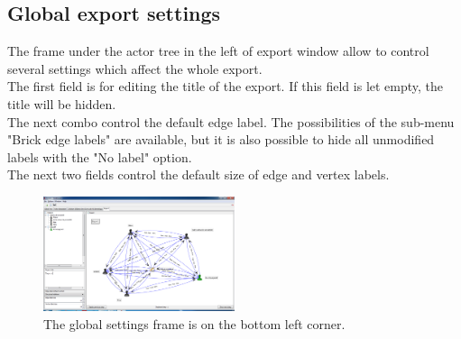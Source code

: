 \subsection{Global export settings}
\label{globalExport}
The frame under the actor tree in the left of export window allow to control several settings which affect the whole export.\\

The first field is for editing the title of the export. If this field is let empty, the title will be hidden.\\

The next combo control the default edge label. The possibilities of the sub-menu "Brick edge labels" are available, but it is also possible to hide all unmodified labels with the "No label" option.\\

The next two fields control the default size of edge and vertex labels.\\

\begin{figure}[h!]
\centering
\includegraphics[width=0.5\textwidth]{../images/export_global.png}
\caption{The global settings frame is on the bottom left corner.}
\end{figure}



